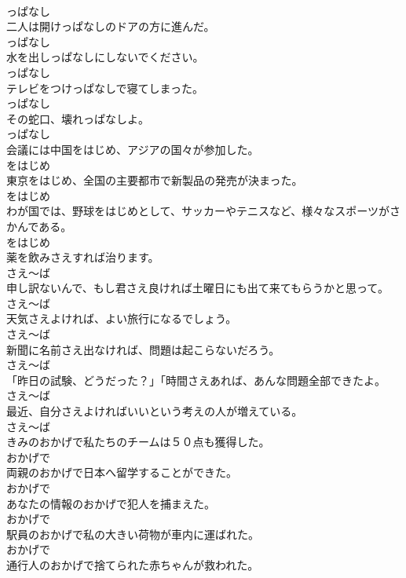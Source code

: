 \documentclass[8pt]{extreport}
\begin{document}
\begin{CJK}{UTF8}{min}
\\	っぱなし
\\	二人は開けっぱなしのドアの方に進んだ。	
\\	っぱなし
\\	水を出しっぱなしにしないでください。	
\\	っぱなし
\\	テレビをつけっぱなしで寝てしまった。	
\\	っぱなし
\\	その蛇口、壊れっぱなしよ。	
\\	っぱなし
\\	会議には中国をはじめ、アジアの国々が参加した。	
\\	をはじめ
\\	東京をはじめ、全国の主要都市で新製品の発売が決まった。	
\\	をはじめ
\\	わが国では、野球をはじめとして、サッカーやテニスなど、様々なスポーツがさかんである。	
\\	をはじめ
\\	薬を飲みさえすれば治ります。	
\\	さえ～ば
\\	申し訳ないんで、もし君さえ良ければ土曜日にも出て来てもらうかと思って。	
\\	さえ～ば
\\	天気さえよければ、よい旅行になるでしょう。	
\\	さえ～ば
\\	新聞に名前さえ出なければ、問題は起こらないだろう。	
\\	さえ～ば
\\	「昨日の試験、どうだった？」「時間さえあれば、あんな問題全部できたよ。	
\\	さえ～ば
\\	最近、自分さえよければいいという考えの人が増えている。	
\\	さえ～ば
\\	きみのおかげで私たちのチームは５０点も獲得した。	
\\	おかげで
\\	両親のおかげで日本へ留学することができた。	
\\	おかげで
\\	あなたの情報のおかげで犯人を捕まえた。	
\\	おかげで
\\	駅員のおかげで私の大きい荷物が車内に運ばれた。	
\\	おかげで
\\	通行人のおかげで捨てられた赤ちゃんが救われた。	

\end{CJK}
\end{document}
